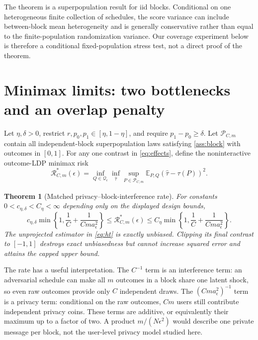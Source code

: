 \documentclass[11pt]{article}
\newtheorem{theorem}{Theorem}
\theoremstyle{definition}
\theoremstyle{remark}
\newcommand{\E}{\mathbb{E}}
\newcommand{\doisig}{a_{\epsilon}}
\begin{document}
The theorem is a superpopulation result for iid blocks. Conditional on one heterogeneous
finite collection of schedules, the score variance can include between-block mean
heterogeneity and is generally conservative rather than equal to the finite-population
randomization variance. Our coverage experiment below is therefore a conditional
fixed-population stress test, not a direct proof of the theorem.

\section{Minimax limits: two bottlenecks and an overlap penalty}
\label{sec:minimax}

Let $\eta,\delta>0$, restrict $r,p_0,p_1\in[\eta,1-\eta]$, and require
$p_1-p_0\ge\delta$. Let
$\mathcal P_{C,m}$ contain all independent-block superpopulation laws satisfying
\cref{ass:block} with outcomes in $[0,1]$. For any one contrast in \eqref{eq:effects}, define
the noninteractive outcome-LDP minimax risk
\[
  \mathcal R^*_{C,m}(\epsilon)
  =\inf_{Q\in\mathcal Q_{\epsilon}}\inf_{\widehat\tau}
    \sup_{P\in\mathcal P_{C,m}}
    \E_{P,Q}(\widehat\tau-\tau(P))^2.
\]

\begin{theorem}[Matched privacy--block-interference rate]
\label{thm:minimax}
For constants $0<c_{\eta,\delta}<C_{\eta}<\infty$ depending only on the displayed
design bounds,
\begin{equation}
  c_{\eta,\delta}\min\!\left\{1,\frac1C+\frac{1}{Cm\doisig^2}\right\}
  \le \mathcal R^*_{C,m}(\epsilon)
  \le C_{\eta}\min\!\left\{1,\frac1C+\frac{1}{Cm\doisig^2}\right\}.
  \label{eq:minimax}
\end{equation}
The unprojected estimator in \eqref{eq:ht} is exactly unbiased. Clipping its final contrast to
$[-1,1]$ destroys exact unbiasedness but cannot increase squared error and attains the capped
upper bound.
\end{theorem}

The rate has a useful interpretation. The $C^{-1}$ term is an interference term: an
adversarial schedule can make all $m$ outcomes in a block share one latent shock, so even raw
outcomes provide only $C$ independent draws. The $(Cm\doisig^2)^{-1}$ term is a privacy term:
conditional on the raw outcomes, $Cm$ users still contribute independent privacy coins. These
terms are additive, or equivalently their maximum up to a factor of two. A product
$m/(N\epsilon^2)$ would describe one private message per block, not the user-level privacy
model studied here.
\end{document}

